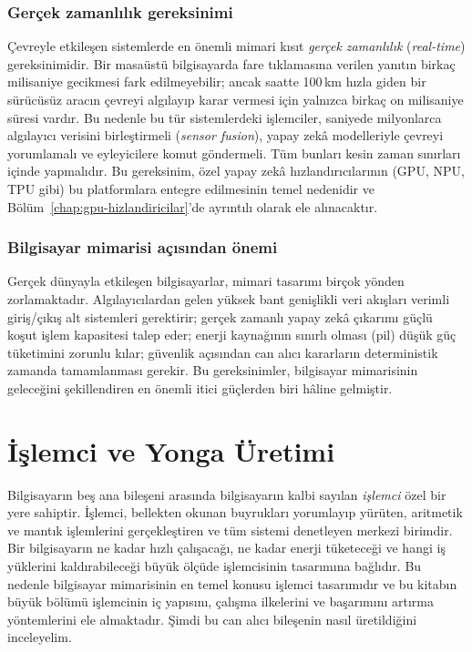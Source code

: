\subsubsection*{Gerçek zamanlılık gereksinimi}
Çevreyle etkileşen sistemlerde en önemli mimari kısıt \emph{gerçek zamanlılık} (\emph{real-time}) gereksinimidir. Bir masaüstü bilgisayarda fare tıklamasına verilen yanıtın birkaç milisaniye gecikmesi fark edilmeyebilir; ancak saatte 100\,km hızla giden bir sürücüsüz aracın çevreyi algılayıp karar vermesi için yalnızca birkaç on milisaniye süresi vardır. Bu nedenle bu tür sistemlerdeki işlemciler, saniyede milyonlarca algılayıcı verisini birleştirmeli (\emph{sensor fusion}), yapay zekâ modelleriyle çevreyi yorumlamalı ve eyleyicilere komut göndermeli. Tüm bunları kesin zaman sınırları içinde yapmalıdır. Bu gereksinim, özel yapay zekâ hızlandırıcılarının (GPU, NPU, TPU gibi) bu platformlara entegre edilmesinin temel nedenidir ve Bölüm~\ref{chap:gpu-hizlandiricilar}'de ayrıntılı olarak ele alınacaktır.

\subsubsection*{Bilgisayar mimarisi açısından önemi}
Gerçek dünyayla etkileşen bilgisayarlar, mimari tasarımı birçok yönden zorlamaktadır. Algılayıcılardan gelen yüksek bant genişlikli veri akışları verimli giriş/çıkış alt sistemleri gerektirir; gerçek zamanlı yapay zekâ çıkarımı güçlü koşut işlem kapasitesi talep eder; enerji kaynağının sınırlı olması (pil) düşük güç tüketimini zorunlu kılar; güvenlik açısından can alıcı kararların deterministik zamanda tamamlanması gerekir. Bu gereksinimler, bilgisayar mimarisinin geleceğini şekillendiren en önemli itici güçlerden biri hâline gelmiştir.


\section{İşlemci ve Yonga Üretimi}
\label{sec:islemci}

Bilgisayarın beş ana bileşeni arasında bilgisayarın kalbi sayılan \emph{işlemci} özel bir yere sahiptir. İşlemci, bellekten okunan buyrukları yorumlayıp yürüten, aritmetik ve mantık işlemlerini gerçekleştiren ve tüm sistemi denetleyen merkezi birimdir. Bir bilgisayarın ne kadar hızlı çalışacağı, ne kadar enerji tüketeceği ve hangi iş yüklerini kaldırabileceği büyük ölçüde işlemcisinin tasarımına bağlıdır. Bu nedenle bilgisayar mimarisinin en temel konusu işlemci tasarımıdır ve bu kitabın büyük bölümü işlemcinin iç yapısını, çalışma ilkelerini ve başarımını artırma yöntemlerini ele almaktadır. Şimdi bu can alıcı bileşenin nasıl üretildiğini inceleyelim.

